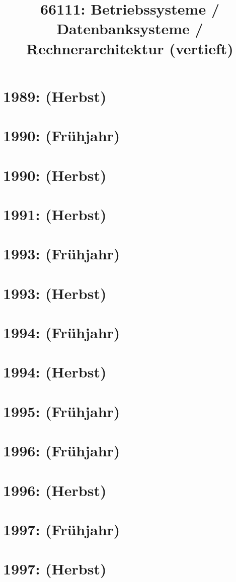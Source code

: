 \documentclass{lehramt-informatik-haupt}
\title{66111: Betriebssysteme / Datenbanksysteme / Rechnerarchitektur (vertieft)}
\begin{document}
\maketitle
\tableofcontents

\section{1989: (Herbst)}


\section{1990: (Frühjahr)}


\section{1990: (Herbst)}


\section{1991: (Herbst)}


\section{1993: (Frühjahr)}


\section{1993: (Herbst)}


\section{1994: (Frühjahr)}


\section{1994: (Herbst)}


\section{1995: (Frühjahr)}


\section{1996: (Frühjahr)}


\section{1996: (Herbst)}


\section{1997: (Frühjahr)}


\section{1997: (Herbst)}

\end{document}
